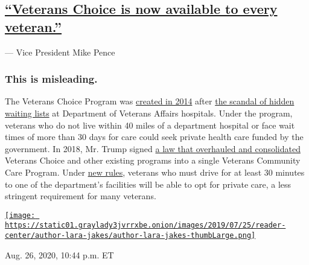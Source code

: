 \hypertarget{veterans-choice-is-now-available-to-every-veteran}{%
\subsection{\texorpdfstring{\protect\hyperlink{veterans-choice-is-now-available-to-every-veteran}{``Veterans
Choice is now available to every
veteran.''}}{``Veterans Choice is now available to every veteran.''}}\label{veterans-choice-is-now-available-to-every-veteran}}

--- Vice President Mike Pence

\hypertarget{this-is-misleading-5}{%
\subsubsection{\texorpdfstring{\textbf{This is
misleading.}}{This is misleading.}}\label{this-is-misleading-5}}

The Veterans Choice Program was
\href{https://slack-redir.net/link?url=https\%3A\%2F\%2Fwww.congress.gov\%2Fbill\%2F113th-congress\%2Fhouse-bill\%2F3230}{created
in 2014} after
\href{https://slack-redir.net/link?url=https\%3A\%2F\%2Fwww.nytimes3xbfgragh.onion\%2F2014\%2F05\%2F29\%2Fus\%2Fva-report-confirms-improper-waiting-lists-at-phoenix-center.html\%3Fmodule\%3Dinline}{the
scandal of hidden waiting lists} at Department of Veterans Affairs
hospitals. Under the program, veterans who do not live within 40 miles
of a department hospital or face wait times of more than 30 days for
care could seek private health care funded by the government. In 2018,
Mr. Trump signed
\href{https://slack-redir.net/link?url=https\%3A\%2F\%2Fwww.nytimes3xbfgragh.onion\%2F2018\%2F05\%2F23\%2Fus\%2Fpolitics\%2Fveterans-health-care.html\%3Fmodule\%3Dinline}{a
law that overhauled and consolidated} Veterans Choice and other existing
programs into a single Veterans Community Care Program. Under
\href{https://slack-redir.net/link?url=https\%3A\%2F\%2Fwww.nytimes3xbfgragh.onion\%2F2019\%2F01\%2F30\%2Fus\%2Fpolitics\%2Fveterans-health-care.html}{new
rules}, veterans who must drive for at least 30 minutes to one of the
department's facilities will be able to opt for private care, a less
stringent requirement for many veterans.

\href{https://www.nytimes3xbfgragh.onion/by/lara-jakes}{\texttt{[image: https://static01.graylady3jvrrxbe.onion/images/2019/07/25/reader-center/author-lara-jakes/author-lara-jakes-thumbLarge.png]}}

Aug. 26, 2020, 10:44 p.m. ET

